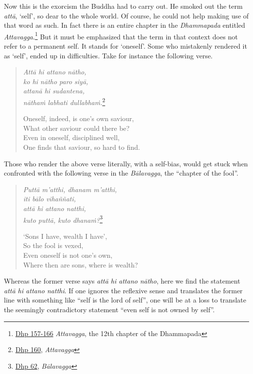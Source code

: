 Now this is the exorcism the Buddha had to carry out. He smoked out the term \emph{attā}, `self', so dear to the whole world. Of course, he could not help making use of that word as such. In fact there is an entire chapter in the \emph{Dhammapada} entitled \emph{Attavagga}.\footnote{\href{https://suttacentral.net/dhp157-166/pli/ms}{Dhp 157-166} \emph{Attavagga}, the 12th chapter of the Dhammapada} But it must be emphasized that the term in that context does not refer to a permanent self. It stands for `oneself'. Some who mistakenly rendered it as `self', ended up in difficulties. Take for instance the following verse.

\begin{quote}
\emph{Attā hi attano nātho,}\\
\emph{ko hi nātho paro siyā,}\\
\emph{attanā hi sudantena,}\\
\emph{nāthaṁ labhati dullabhaṁ.}\footnote{\href{https://suttacentral.net/dhp157-166/pli/ms}{Dhp 160}, \emph{Attavagga}}

Oneself, indeed, is one's own saviour,\\
What other saviour could there be?\\
Even in oneself, disciplined well,\\
One finds that saviour, so hard to find.
\end{quote}

Those who render the above verse literally, with a self-bias, would get stuck when confronted with the following verse in the \emph{Bālavagga}, the ``chapter of the fool''.

\begin{quote}
\emph{Puttā m'atthi, dhanam m'atthi,}\\
\emph{iti bālo vihaññati,}\\
\emph{attā hi attano natthi,}\\
\emph{kuto puttā, kuto dhanaṁ?}\footnote{\href{https://suttacentral.net/dhp60-75/pli/ms}{Dhp 62}, \emph{Bālavagga}}

`Sons I have, wealth I have',\\
So the fool is vexed,\\
Even oneself is not one's own,\\
Where then are sons, where is wealth?
\end{quote}

Whereas the former verse says \emph{attā hi attano nātho}, here we find the statement \emph{attā hi attano natthi}. If one ignores the reflexive sense and translates the former line with something like ``self is the lord of self'', one will be at a loss to translate the seemingly contradictory statement ``even self is not owned by self''.

